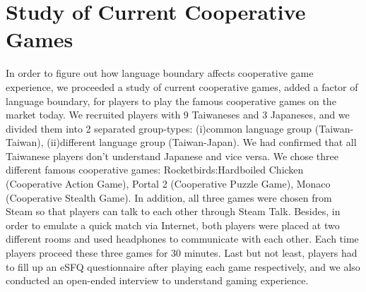 \section{Study of Current Cooperative Games}


In order to figure out how language boundary affects cooperative game experience, we proceeded a study of current cooperative games, added a factor of language boundary, for players to play the famous cooperative games on the market today. We recruited players with 9 Taiwaneses and 3 Japaneses, and we divided them into 2 separated group-types: (i)common language group (Taiwan-Taiwan), (ii)different language group (Taiwan-Japan). We had confirmed that all Taiwanese players don't understand Japanese and vice versa. We chose three different famous cooperative games: Rocketbirds:Hardboiled Chicken (Cooperative Action Game), Portal 2 (Cooperative Puzzle Game), Monaco (Cooperative Stealth Game). In addition, all three games were chosen from Steam so that players can talk to each other through Steam Talk. Besides, in order to emulate a quick match via Internet, both players were placed at two different rooms and used headphones to communicate with each other. Each time players proceed these three games for 30 minutes. Last but not least, players had to fill up an eSFQ\cite{eSFQ} questionnaire after playing each game respectively, and we also conducted an open-ended interview to understand gaming experience. 

